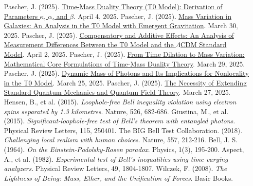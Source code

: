\documentclass[a4paper,12pt]{article}
\theoremstyle{definition}
\theoremstyle{remark}
\begin{document}
	\begin{thebibliography}{99}
		 Pascher, J. (2025). \href{https://github.com/jpascher/T0-Time-Mass-Duality/tree/main/2/pdf/English/ZeitMasseT0ParamsEn.pdf}{Time-Mass Duality Theory (T0 Model): Derivation of Parameters \(\kappa\), \(\alpha\), and \(\beta\)}. April 4, 2025.
		 Pascher, J. (2025). \href{https://github.com/jpascher/T0-Time-Mass-Duality/tree/main/2/pdf/English/MassVarGalaxienEn.pdf}{Mass Variation in Galaxies: An Analysis in the T0 Model with Emergent Gravitation}. March 30, 2025.
		 Pascher, J. (2025). \href{https://github.com/jpascher/T0-Time-Mass-Duality/tree/main/2/pdf/English/MessdifferenzenT0StandardEn.pdf}{Compensatory and Additive Effects: An Analysis of Measurement Differences Between the T0 Model and the \(\Lambda\)CDM Standard Model}. April 2, 2025.
		 Pascher, J. (2025). \href{https://github.com/jpascher/T0-Time-Mass-Duality/tree/main/2/pdf/English/MathZeitMasseLagrangeEn.pdf}{From Time Dilation to Mass Variation: Mathematical Core Formulations of Time-Mass Duality Theory}. March 29, 2025.
		 Pascher, J. (2025). \href{https://github.com/jpascher/T0-Time-Mass-Duality/tree/main/2/pdf/English/DynMassePhotonenNichtlokalEn.pdf}{Dynamic Mass of Photons and Its Implications for Nonlocality in the T0 Model}. March 25, 2025.
		 Pascher, J. (2025). \href{https://github.com/jpascher/T0-Time-Mass-Duality/tree/main/2/pdf/English/NotwendigkeitQMErweiterungEn.pdf}{The Necessity of Extending Standard Quantum Mechanics and Quantum Field Theory}. March 27, 2025.
		 Hensen, B., et al. (2015). \textit{Loophole-free Bell inequality violation using electron spins separated by 1.3 kilometres}. Nature, 526, 682-686.
		 Giustina, M., et al. (2015). \textit{Significant-loophole-free test of Bell's theorem with entangled photons}. Physical Review Letters, 115, 250401.
		 The BIG Bell Test Collaboration. (2018). \textit{Challenging local realism with human choices}. Nature, 557, 212-216.
		 Bell, J. S. (1964). \textit{On the Einstein-Podolsky-Rosen paradox}. Physics, 1(3), 195-200.
		 Aspect, A., et al. (1982). \textit{Experimental test of Bell's inequalities using time-varying analyzers}. Physical Review Letters, 49, 1804-1807.
		 Wilczek, F. (2008). \textit{The Lightness of Being: Mass, Ether, and the Unification of Forces}. Basic Books.

\end{thebibliography}
\end{document}
